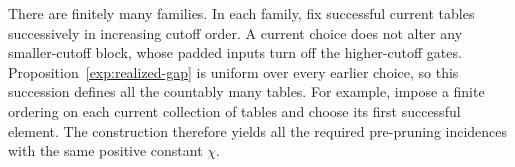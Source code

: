 There are finitely many families. In each family, fix successful
current tables successively in increasing cutoff order. A current
choice does not alter any smaller-cutoff block, whose padded inputs
turn off the higher-cutoff gates. Proposition~\ref{exp:realized-gap}
is uniform over every earlier choice, so this succession defines
all the countably many tables. For example, impose a finite ordering
on each current collection of tables and choose its first successful
element. The construction therefore yields all the required
pre-pruning incidences with the same positive constant $\chi$.
